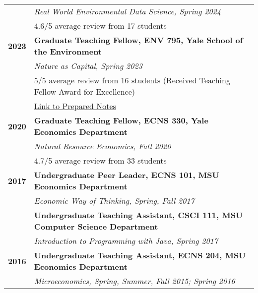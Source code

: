 \documentclass[11pt]{article}
\begin{document}
\begin{tabularx}{\linewidth}{>{\bfseries}r X}
    & \textit{Real World Environmental Data Science, Spring 2024} \\
    & 4.6/5 average review from 17 students \\
2023 & \textbf{Graduate Teaching Fellow, ENV 795, Yale School of the Environment} \\
    & \textit{Nature as Capital, Spring 2023} \\
    & 5/5 average review from 16 students (Received Teaching Fellow Award for Excellence)\\
    & \href{https://github.com/a5creel/nature_as_capital}{Link to Prepared Notes} \\[1ex]
2020 & \textbf{Graduate Teaching Fellow, ECNS 330, Yale Economics Department} \\
    & \textit{Natural Resource Economics, Fall 2020} \\
    & 4.7/5 average review from 33 students \\[1ex]
2017 & \textbf{Undergraduate Peer Leader, ECNS 101, MSU Economics Department} \\
    & \textit{Economic Way of Thinking, Spring, Fall 2017} \\[1ex]
    & \textbf{Undergraduate Teaching Assistant, CSCI 111, MSU Computer Science Department} \\
    & \textit{Introduction to Programming with Java, Spring 2017} \\[1ex]
2016 & \textbf{Undergraduate Teaching Assistant, ECNS 204, MSU Economics Department} \\
    & \textit{Microeconomics, Spring, Summer, Fall 2015; Spring 2016} \\
\end{tabularx}
\end{document}
